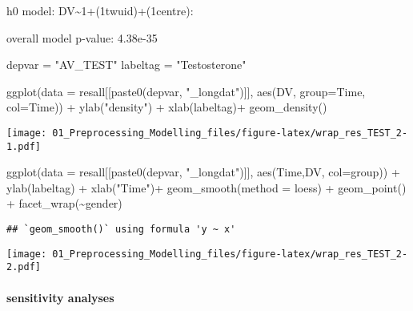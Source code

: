 \documentclass[
]{article}
\newenvironment{Shaded}{\begin{snugshade}}{\end{snugshade}}
\newcommand{\AttributeTok}[1]{\textcolor[rgb]{0.77,0.63,0.00}{#1}}
\newcommand{\FunctionTok}[1]{\textcolor[rgb]{0.00,0.00,0.00}{#1}}
\newcommand{\NormalTok}[1]{#1}
\newcommand{\OtherTok}[1]{\textcolor[rgb]{0.56,0.35,0.01}{#1}}
\newcommand{\SpecialCharTok}[1]{\textcolor[rgb]{0.00,0.00,0.00}{#1}}
\newcommand{\StringTok}[1]{\textcolor[rgb]{0.31,0.60,0.02}{#1}}
\begin{document}
h0 model: DV\textasciitilde1+(1\textbar twuid)+(1\textbar centre):

overall model p-value: 4.38e-35

\begin{Shaded}
\begin{Highlighting}[]
\NormalTok{depvar }\OtherTok{=} \StringTok{"AV\_TEST"}
\NormalTok{labeltag }\OtherTok{=} \StringTok{"Testosterone"}

\FunctionTok{ggplot}\NormalTok{(}\AttributeTok{data =}\NormalTok{ resall[[}\FunctionTok{paste0}\NormalTok{(depvar, }\StringTok{"\_longdat"}\NormalTok{)]], }
       \FunctionTok{aes}\NormalTok{(DV, }\AttributeTok{group=}\NormalTok{Time, }\AttributeTok{col=}\NormalTok{Time)) }\SpecialCharTok{+} 
  \FunctionTok{ylab}\NormalTok{(}\StringTok{"density"}\NormalTok{) }\SpecialCharTok{+} \FunctionTok{xlab}\NormalTok{(labeltag)}\SpecialCharTok{+}
  \FunctionTok{geom\_density}\NormalTok{()}
\end{Highlighting}
\end{Shaded}

\texttt{[image: 01\_Preprocessing\_Modelling\_files/figure-latex/wrap\_res\_TEST\_2-1.pdf]}

\begin{Shaded}
\begin{Highlighting}[]
\FunctionTok{ggplot}\NormalTok{(}\AttributeTok{data =}\NormalTok{ resall[[}\FunctionTok{paste0}\NormalTok{(depvar, }\StringTok{"\_longdat"}\NormalTok{)]], }
       \FunctionTok{aes}\NormalTok{(Time,DV, }\AttributeTok{col=}\NormalTok{group)) }\SpecialCharTok{+} 
  \FunctionTok{ylab}\NormalTok{(labeltag) }\SpecialCharTok{+} \FunctionTok{xlab}\NormalTok{(}\StringTok{"Time"}\NormalTok{)}\SpecialCharTok{+}
  \FunctionTok{geom\_smooth}\NormalTok{(}\AttributeTok{method =} \StringTok{\textquotesingle{}loess\textquotesingle{}}\NormalTok{) }\SpecialCharTok{+} \FunctionTok{geom\_point}\NormalTok{() }\SpecialCharTok{+}   \FunctionTok{facet\_wrap}\NormalTok{(}\SpecialCharTok{\textasciitilde{}}\NormalTok{gender)}
\end{Highlighting}
\end{Shaded}

\begin{verbatim}
## `geom_smooth()` using formula 'y ~ x'
\end{verbatim}

\texttt{[image: 01\_Preprocessing\_Modelling\_files/figure-latex/wrap\_res\_TEST\_2-2.pdf]}

\hypertarget{sensitivity-analyses-2}{%
\paragraph{sensitivity analyses}\label{sensitivity-analyses-2}}
\end{document}
